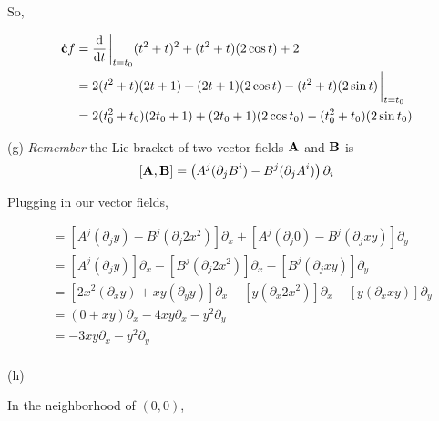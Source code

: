 \documentclass[11pt]{article}
\begin{document}
\begin{enumerate}[start=1,label={\bfseries Exercise \arabic*:},leftmargin=1in]
        So,

        \begin{align*}
            \dot{\vb{c}} f &= \dv{t} \eval_{t=t_0} (t^2+t)^2 + (t^2+t)(2\cos{t}) + 2  \\
                           &= 2(t^2+t)(2t+1) + (2t+1)(2\cos{t}) - (t^2+t)(2\sin{t}) \eval_{t=t_0} \\
                           &= 2(t_0^2+t_0)(2t_0+1) + (2t_0+1)(2\cos{t_0}) - (t_0^2+t_0)(2\sin{t_0})
        \end{align*}

        \noindent (g) \emph{Remember} the Lie bracket of two vector fields \(\vb{A}\) and \(\vb{B}\) is \[ [\vb{A}, \vb{B}] = \left( A^j(\partial_j B^i) - B^j(\partial_j A^i) \right) \partial_i\]

        \noindent Plugging in our vector fields,

        \begin{align*}
            [\vb{A}, \vb{B}] &= [ A^j ( \partial_j y ) - B^j ( \partial_j 2x^2 ) ]\partial_x + [ A^j ( \partial_j 0 ) - B^j ( \partial_j xy )  ]\partial_y \\
                             &= [ A^j ( \partial_j y ) ]\partial_x - [ B^j ( \partial_j 2x^2 ) ]\partial_x - [ B^j ( \partial_j xy )  ]\partial_y \\
                             &= [ 2x^2(\partial_x y ) + xy(\partial_y y ) ]\partial_x - [ y(\partial_x 2x^2)]\partial_x - [ y (\partial_x xy)  ]\partial_y \\
                             &= (0+xy)\partial_x - 4xy\partial_x - y^2\partial_y \\
                             &= -3xy\partial_x - y^2\partial_y \\
        \end{align*}

        \noindent (h)

        \noindent In the neighborhood of \((0,0)\),

        \begin{center}
        \end{center}


\end{enumerate}
\end{document}
